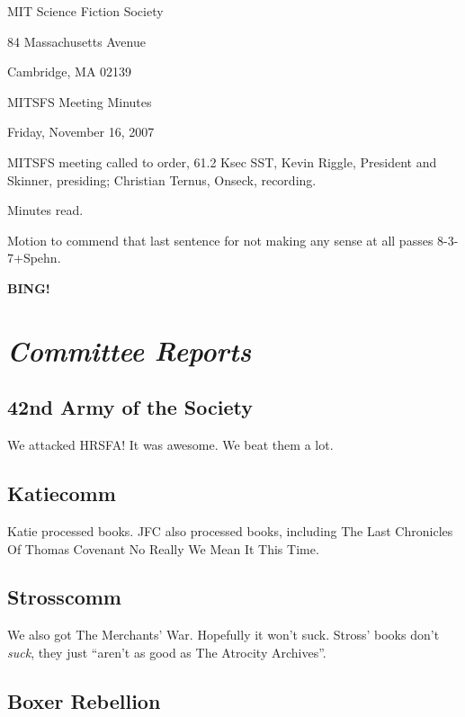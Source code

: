\documentclass[10pt]{article}
\newcommand{\bing}{{\bf BING!} }
\newcommand{\goto}[1]{\bing \vskip 12pt \section*{{\em{#1}}}}
\begin{document}
\begin{center}

MIT Science Fiction Society

84 Massachusetts Avenue

Cambridge, MA 02139

\vspace{12pt}

MITSFS Meeting Minutes

Friday, November 16, 2007

\end{center}

\vspace{18pt}

\setlength{\parskip}{6pt}

\noindent
MITSFS meeting called to order, 61.2 Ksec SST,
Kevin Riggle, President and Skinner, presiding; Christian Ternus, Onseck, recording.

Minutes read.

Motion to commend that last sentence for not making any sense at all passes 8-3-7+Spehn.

\BING

\goto{Committee Reports}

\subsection*{42nd Army of the Society}

We attacked HRSFA!  It was awesome.  We beat them a lot.

\subsection*{Katiecomm}

Katie processed books.  JFC also processed books, including The Last Chronicles Of Thomas Covenant No Really We Mean It This Time.

\subsection*{Strosscomm}

We also got The Merchants' War.  Hopefully it won't suck.  Stross' books don't \emph{suck}, they just ``aren't as good as The Atrocity Archives''.

\subsection*{Boxer Rebellion}
\end{document}
